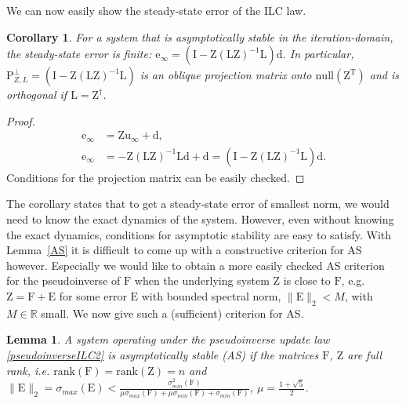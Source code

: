 \documentclass[10pt,a4paper]{article}
\theoremstyle{plain}
\newtheorem{cor}{Corollary}[section]
\newtheorem{lem}{Lemma}
\theoremstyle{definition}
\newcommand{\boldvec}[1]{\boldsymbol{\mathrm{#1}}}
\let\vec\boldvec
\newcommand{\error}{\vec{e}} %
\newcommand{\linDist}{\vec{d}} %
\newcommand{\sysInput}{\vec{u}} %
\newcommand{\latentMat}{\vec{Z}} %
\newcommand{\errorMat}{\vec{E}} %
\newcommand{\lmatrix}{\vec{L}} %
\newcommand{\systemMat}{\vec{F}} %
\newcommand{\projOblique}{\vec{P}_{Z,L}^{\perp}} %
\begin{document}
%
We can now easily show the steady-state error of the ILC law.
%
\begin{cor}
For a system that is asymptotically stable in the iteration-domain, the steady-state error is finite: $\error_{\infty} = (\vec{I} - \latentMat(\lmatrix\latentMat)^{-1}\lmatrix)\linDist$. In particular, $\projOblique = (\vec{I} - \latentMat(\lmatrix\latentMat)^{-1}\lmatrix)$ is an oblique projection matrix onto $\mathrm{null}(\latentMat^{\mathrm{T}})$ and is orthogonal if $\lmatrix = \latentMat^{\dagger}$.
\end{cor}
%
\begin{proof}
%
\begin{align}
\error_{\infty} &= \latentMat\sysInput_{\infty} + \linDist, \\
\error_{\infty} &= -\latentMat(\lmatrix\latentMat)^{-1}\lmatrix\linDist + \linDist = (\vec{I} - \latentMat(\lmatrix\latentMat)^{-1}\lmatrix)\linDist.
\end{align}
%
Conditions for the projection matrix can be easily checked.
\end{proof}
%
The corollary states that to get a steady-state error of smallest norm, we would need to know the exact dynamics of the system. However, even without knowing the exact dynamics, conditions for asymptotic stability are easy to satisfy. %
With Lemma~\ref{AS} it is difficult to come up with a constructive criterion for AS however. Especially we would like to obtain a more easily checked AS criterion for the pseudoinverse of $\systemMat$ when the underlying system $\latentMat$ is close to $\systemMat$, e.g. $\latentMat = \systemMat + \errorMat$ for some error $\errorMat$ with bounded spectral norm, $\|\errorMat\|_2 < M$, with $M \in \mathbb{R}$ small. We now give such a (sufficient) criterion for AS.
%
\begin{lem}
A system operating under the pseudoinverse update law \eqref{pseudoinverseILC2} is asymptotically stable (AS) if the matrices $\systemMat$, $\latentMat$ are full rank, i.e. $\mathrm{rank}(\systemMat) = \mathrm{rank}(\latentMat) = n$ and $\|\errorMat\|_2 = \sigma_{max}(\errorMat) < \frac{\sigma_{min}^{2}(\systemMat)}{\mu\sigma_{max}(\systemMat) + \mu\sigma_{min}(\systemMat) + \sigma_{min}(\systemMat)}$, $\mu = \frac{1 + \sqrt{5}}{2}$.
\end{lem}
%
\end{document}
